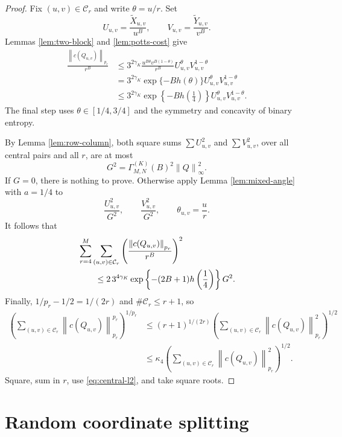 \documentclass[11pt]{article}
\theoremstyle{definition}
\theoremstyle{remark}
\newcommand{\norm}[1]{\left\lVert #1\right\rVert}
\begin{document}
\begin{proof}
Fix $(u,v)\in\mathcal C_r$ and write $\theta=u/r$.  Set
\[
 U_{u,v}=\frac{\widetilde X_{u,v}}{u^B},
 \qquad
 V_{u,v}=\frac{\widetilde Y_{u,v}}{v^B}.
\]
Lemmas \ref{lem:two-block} and \ref{lem:potts-cost} give
\begin{align*}
 \frac{\norm{c(Q_{u,v})}_{p_r}}{r^B}
 &\le3^{2\gamma_K}
 \frac{u^{B\theta}v^{B(1-\theta)}}{r^B}
 U_{u,v}^{\theta}V_{u,v}^{1-\theta}\\
 &=3^{2\gamma_K}\exp\{-Bh(\theta)\}
 U_{u,v}^{\theta}V_{u,v}^{1-\theta}\\
 &\le3^{2\gamma_K}
 \exp\left\{-Bh\left(\frac14\right)\right\}
 U_{u,v}^{\theta}V_{u,v}^{1-\theta}.
\end{align*}
The final step uses $\theta\in[1/4,3/4]$ and the symmetry and concavity of
binary entropy.

By Lemma \ref{lem:row-column}, both square sums
$\sum U_{u,v}^2$ and $\sum V_{u,v}^2$, over all central pairs and all $r$,
are at most
\[
 G^2=\Gamma^{(K)}_{M,N}(B)^2\norm Q_\infty^2.
\]
If $G=0$, there is nothing to prove.  Otherwise apply Lemma
\ref{lem:mixed-angle} with $a=1/4$ to
\[
 \frac{U_{u,v}^2}{G^2},
 \qquad
 \frac{V_{u,v}^2}{G^2},
 \qquad
 \theta_{u,v}=\frac ur.
\]
It follows that
\begin{align}
&\sum_{r=4}^M\sum_{(u,v)\in\mathcal C_r}
 \left(\frac{\norm{c(Q_{u,v})}_{p_r}}{r^B}\right)^2
\notag\\
&\qquad\le
2\,3^{4\gamma_K}
\exp\left\{-(2B+1)h\left(\frac14\right)\right\}G^2.
\label{eq:central-l2}
\end{align}
Finally,
$1/p_r-1/2=1/(2r)$ and $\#\mathcal C_r\le r+1$, so
\begin{align*}
 \left(
  \sum_{(u,v)\in\mathcal C_r}
  \norm{c(Q_{u,v})}_{p_r}^{p_r}
 \right)^{1/p_r}
 &\le(r+1)^{1/(2r)}
 \left(
  \sum_{(u,v)\in\mathcal C_r}
  \norm{c(Q_{u,v})}_{p_r}^{2}
 \right)^{1/2}\\
 &\le\kappa_4
 \left(
  \sum_{(u,v)\in\mathcal C_r}
  \norm{c(Q_{u,v})}_{p_r}^{2}
 \right)^{1/2}.
\end{align*}
Square, sum in $r$, use \eqref{eq:central-l2}, and take square roots.
\end{proof}

\section{Random coordinate splitting}
\end{document}
